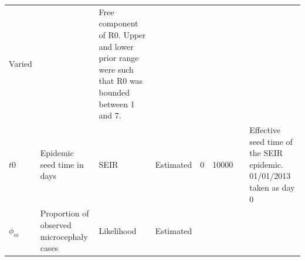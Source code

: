\documentclass[10pt,letterpaper]{article}
\begin{document}
\begin{longtable}[]{@{}llllllll@{}}
\begin{minipage}[t]{0.04\columnwidth}
Varied\strut
\end{minipage} & \begin{minipage}[t]{0.14\columnwidth}\raggedright\strut
\strut
\end{minipage} & \begin{minipage}[t]{0.26\columnwidth}\raggedright\strut
Free component of R0. Upper and lower prior range were such that R0 was
bounded between 1 and 7.\strut
\end{minipage}\tabularnewline
\begin{minipage}[t]{0.04\columnwidth}\raggedright\strut
\(t0\)\strut
\end{minipage} & \begin{minipage}[t]{0.17\columnwidth}\raggedright\strut
Epidemic seed time in days\strut
\end{minipage} & \begin{minipage}[t]{0.05\columnwidth}\raggedright\strut
SEIR\strut
\end{minipage} & \begin{minipage}[t]{0.05\columnwidth}\raggedright\strut
Estimated\strut
\end{minipage} & \begin{minipage}[t]{0.04\columnwidth}\raggedright\strut
0\strut
\end{minipage} & \begin{minipage}[t]{0.04\columnwidth}\raggedright\strut
10000\strut
\end{minipage} & \begin{minipage}[t]{0.14\columnwidth}\raggedright\strut
\strut
\end{minipage} & \begin{minipage}[t]{0.26\columnwidth}\raggedright\strut
Effective seed time of the SEIR epidemic. 01/01/2013 taken as day
0\strut
\end{minipage}\tabularnewline
\begin{minipage}[t]{0.04\columnwidth}\raggedright\strut
\(\phi_m\)\strut
\end{minipage} & \begin{minipage}[t]{0.17\columnwidth}\raggedright\strut
Proportion of observed microcephaly cases\strut
\end{minipage} & \begin{minipage}[t]{0.05\columnwidth}\raggedright\strut
Likelihood\strut
\end{minipage} & \begin{minipage}[t]{0.05\columnwidth}\raggedright\strut
Estimated\strut
\end{minipage} & \begin{minipage}[t]{0.04\columnwidth}\raggedright\strut

\end{minipage}
\end{longtable}
\end{document}
